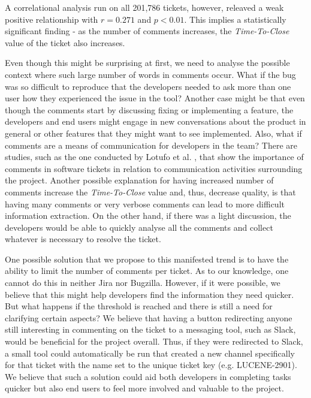 \documentclass{mpaper}
\begin{document}
A correlational analysis run on all 201,786 tickets, however, releaved a weak positive relationship with $r = 0.271$ and $p < 0.01$. 
This implies a statistically significant finding - as the number of comments increases, the \emph{Time-To-Close} value of the ticket 
also increases. 

Even though this might be surprising at first, we need to analyse the possible context where such large 
number of words in comments occur. What if the bug was so difficult to reproduce that the developers needed to 
ask more than one user how they experienced the issue in the tool? Another case might be that even though 
the comments start by discussing fixing or implementing a feature, the developers and end users might 
engage in new conversations about the product in general or other features that they might want to see 
implemented. Also, what if comments are a means of communication for developers in the team? There are studies, 
such as the one conducted by Lotufo et al. \cite{lotufo2015modelling}, that show the importance of comments 
in software tickets in relation to communication activities surrounding the project. Another possible explanation 
for having increased number of comments increase the \emph{Time-To-Close} value and, thus, decrease quality, is that 
having many comments or very verbose comments can lead to more difficult information extraction. On the other 
hand, if there was a light discussion, the developers would be able to quickly analyse all the comments 
and collect whatever is necessary to resolve the ticket.

One possible solution that we propose to this manifested trend is to have the ability to limit the number of 
comments per ticket. As to our knowledge, one cannot do this in neither Jira nor Bugzilla. However, if it were 
possible, we believe that this might help developers find the information they need quicker. But what happens 
if the threshold is reached and there is still a need for clarifying certain aspects? We believe that having 
a button redirecting anyone still interesting in commenting on the ticket to a messaging tool, such as 
Slack, would be beneficial for the project overall. Thus, if they were redirected to Slack, a small 
tool could automatically be run that created a new channel specifically for that ticket with the name set 
to the unique ticket key (e.g. LUCENE-2901). We believe that such a solution could aid both developers in 
completing tasks quicker but also end users to feel more involved and valuable to the project.
\end{document}
